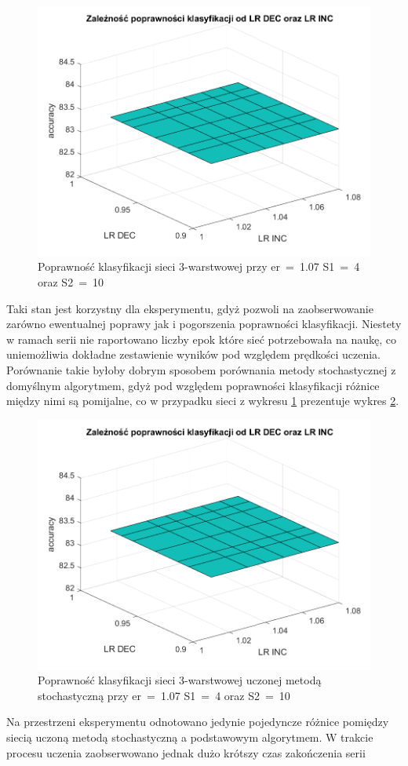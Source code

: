 \documentclass[12pt,twoside]{article}
\begin{document}
\begin{figure}[ht]
	\centering
	\includegraphics[width=16cm]{figures/Stoch_1.png}
	\caption{Poprawność klasyfikacji sieci 3-warstwowej przy er~=~1.07 S1~=~4 oraz S2~=~10}
	\label{Fig:Stoch1}
\end{figure}
Taki stan jest korzystny dla eksperymentu, gdyż pozwoli na zaobserwowanie zarówno ewentualnej poprawy jak i pogorszenia poprawności klasyfikacji.
Niestety w ramach serii nie raportowano liczby epok które sieć potrzebowała na naukę, co uniemożliwia dokładne zestawienie wyników pod względem prędkości uczenia.
Porównanie takie byłoby dobrym sposobem porównania metody stochastycznej z domyślnym algorytmem, gdyż pod względem poprawności klasyfikacji różnice między nimi są pomijalne, co w przypadku sieci z wykresu \ref{Fig:Stoch1} prezentuje wykres \ref{Fig:Stoch2}.


\begin{figure}[ht]
	\centering
	\includegraphics[width=16cm]{figures/Stoch_2.png}
	\caption{Poprawność klasyfikacji sieci 3-warstwowej uczonej metodą stochastyczną przy er~=~1.07 S1~=~4 oraz S2~=~10}
	\label{Fig:Stoch2}
\end{figure}
Na przestrzeni eksperymentu odnotowano jedynie pojedyncze różnice pomiędzy siecią uczoną metodą stochastyczną a podstawowym algorytmem.
W trakcie procesu uczenia zaobserwowano jednak dużo krótszy czas zakończenia serii
\end{document}
